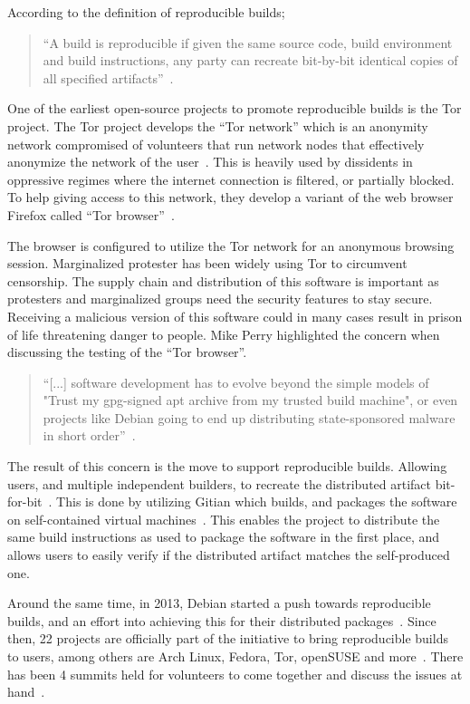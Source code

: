 \documentclass[../Main/thesis.tex]{subfiles}
\begin{document}
According to the definition of reproducible builds;

\begin{quotation}
``A build is reproducible if given the same source code, build environment
and build instructions, any party can recreate bit-by-bit identical copies of
all specified artifacts''~\cite{reproducible-builds-2019-definitions}.
\end{quotation}

One of the earliest open-source projects to promote reproducible builds is the
Tor project. The Tor project develops the ``Tor network'' which is an anonymity
network compromised of volunteers that run network nodes that effectively
anonymize the network of the user~\cite{tor}. This is heavily used by dissidents
in oppressive regimes where the internet connection is filtered, or partially
blocked. To help giving access to this network, they develop a variant of the
web browser Firefox called ``Tor browser''~\cite{tor-browser}.

The browser is configured to utilize the Tor network for an anonymous browsing
session. Marginalized protester has been widely using Tor to circumvent
censorship. The supply chain and distribution of this software is important as
protesters and marginalized groups need the security features to stay secure.
Receiving a malicious version of this software could in many cases result in
prison of life threatening danger to people. Mike Perry highlighted the concern
when discussing the testing of the ``Tor browser''.

\begin{quotation}
    ``[...] software development has to evolve beyond the simple models of
"Trust my gpg-signed apt archive from my trusted build machine", or even
projects like Debian going to end up distributing state-sponsored malware in
short order''~\cite{mike-perry-2013}.
\end{quotation}

The result of this concern is the move to support reproducible builds. Allowing
users, and multiple independent builders, to recreate the distributed artifact
bit-for-bit~\cite{unknown-2014}. This is done by utilizing Gitian which builds,
and packages the software on self-contained virtual machines~\cite{gitian}. This
enables the project to distribute the same build instructions as used to package
the software in the first place, and allows users to easily verify if the
distributed artifact matches the self-produced one.

Around the same time, in 2013, Debian started a push towards reproducible
builds, and an effort into achieving this for their distributed
packages~\cite{debian-repro-2013}. Since then, 22 projects are officially part
of the initiative to bring reproducible builds to users, among others are Arch
Linux, Fedora, Tor, openSUSE and more~\cite{repro-who}. There has been 4 summits
held for volunteers to come together and discuss the issues at
hand~\cite{repro-paris}.
\end{document}
